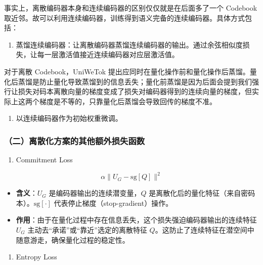 事实上，离散编码器本身和连续编码器的区别仅仅就是在后面多了一个 Codebook 取近邻。故可以利用连续编码器，训练得到语义完备的连续编码器。具体方式包括：

\begin{enumerate}
\def\labelenumi{\arabic{enumi}.}
\tightlist
\item
  蒸馏连续编码器：让离散编码器蒸馏连续编码器的输出。通过余弦相似度损失，让每一层激活值接近连续编码器对应层激活值。
\end{enumerate}

对于离散 Codebook，UniWeTok 提出应同时在量化操作前和量化操作后蒸馏。量化后蒸馏是防止量化导致蒸馏到的信息丢失；量化前蒸馏是因为后面会提到我们强行让损失对码本离散向量的梯度变成了损失对编码器得到的连续向量的梯度，但实际上这两个梯度是不等的，只靠量化后蒸馏会导致回传的梯度不准。

\begin{enumerate}
\def\labelenumi{\arabic{enumi}.}
\setcounter{enumi}{1}
\tightlist
\item
  以连续编码器作为初始权重微调。
\end{enumerate}

\hypertarget{ux4e8cux79bbux6563ux5316ux65b9ux6848ux7684ux5176ux4ed6ux989dux5916ux635fux5931ux51fdux6570}{%
\subsubsection{（二）离散化方案的其他额外损失函数}\label{ux4e8cux79bbux6563ux5316ux65b9ux6848ux7684ux5176ux4ed6ux989dux5916ux635fux5931ux51fdux6570}}

\begin{enumerate}
\def\labelenumi{\arabic{enumi}.}
\tightlist
\item
  Commitment Loss
\end{enumerate}

\[
\alpha\lVert U_G-\mathrm{sg}[Q]\rVert^2
\]

\begin{itemize}
\tightlist
\item
  \textbf{含义}：\(U_G\) 是编码器输出的连续潜变量，\(Q\) 是离散化后的量化特征（来自密码本）。\(\mathrm{sg}[\cdot]\) 代表停止梯度（stop-gradient）操作。
\item
  \textbf{作用}：由于在量化过程中存在信息丢失，这个损失强迫编码器输出的连续特征 \(U_G\) 主动去``承诺''或``靠近''选定的离散特征 \(Q\)。这防止了连续特征在潜空间中随意游走，确保量化过程的稳定性。
\end{itemize}

\begin{enumerate}
\def\labelenumi{\arabic{enumi}.}
\setcounter{enumi}{1}
\tightlist
\item
  Entropy Loss
\end{enumerate}

